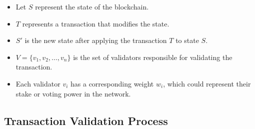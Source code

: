 \documentclass{tufte-handout}
\begin{document}
\begin{itemize}
    \item Let \( S \) represent the state of the blockchain.
    \item \( T \) represents a transaction that modifies the state.
    \item \( S' \) is the new state after applying the transaction \( T \) to state \( S \).
    \item \( V = \{v_1, v_2, \dots, v_n\} \) is the set of validators responsible for validating the transaction.
    \item Each validator \( v_i \) has a corresponding weight \( w_i \), which could represent their stake or voting power in the network.
\end{itemize}

\subsection*{Transaction Validation Process}
\end{document}
